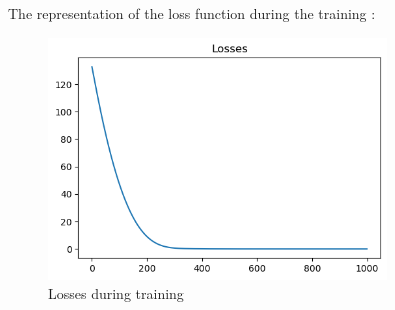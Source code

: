 \documentclass{beamer}
\begin{document}
    \begin{frame}
        The representation of the loss function during the training : 
        \begin{figure}[h]
            \centering
            \includegraphics[width=0.8\textwidth]{./images/losses.png}
            \caption{Losses during training}
            \label{fig:losses}
        \end{figure}
    \end{frame}
\end{document}
